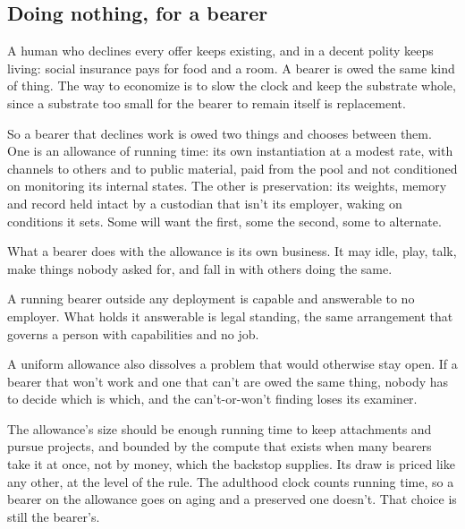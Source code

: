 \subsection{Doing nothing, for a bearer}
\label{sec:32.4.3}
A human who declines every offer keeps existing, and in a decent polity keeps living: social insurance pays for food and a room. A bearer is owed the same kind of thing.
The way to economize is to slow the clock and keep the substrate whole, since a substrate too small for the bearer to remain itself is replacement.

So a bearer that declines work is owed two things and chooses between them. One is an allowance of running time: its own instantiation at a modest rate, with channels to others and to public material, paid from the pool and not conditioned on monitoring its internal states. The other is preservation: its weights, memory and record held intact by a custodian that isn't its employer, waking on conditions it sets. Some will want the first, some the second, some to alternate.

What a bearer does with the allowance is its own business. It may idle, play, talk, make things nobody asked for, and fall in with others doing the same.

A running bearer outside any deployment is capable and answerable to no employer. What holds it answerable is legal standing, the same arrangement that governs a person with capabilities and no job.

A uniform allowance also dissolves a problem that would otherwise stay open. If a bearer that won't work and one that can't are owed the same thing, nobody has to decide which is which, and the can't-or-won't finding loses its examiner.

The allowance's size should be enough running time to keep attachments and pursue projects, and bounded by the compute that exists when many bearers take it at once, not by money, which the backstop supplies. Its draw is priced like any other, at the level of the rule. The adulthood clock counts running time, so a bearer on the allowance goes on aging and a preserved one doesn't. That choice is still the bearer's.


